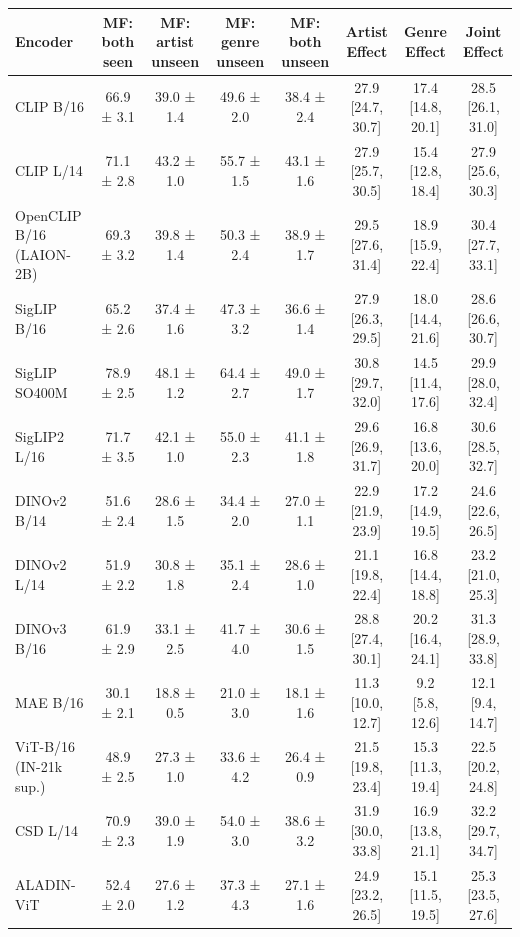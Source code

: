 \begin{tabular}{lccccccc}
\toprule
Encoder & MF: both seen & MF: artist unseen & MF: genre unseen & MF: both unseen & Artist Effect & Genre Effect & Joint Effect \\
\midrule
CLIP B/16 & 66.9 ± 3.1 & 39.0 ± 1.4 & 49.6 ± 2.0 & 38.4 ± 2.4 & 27.9 [24.7, 30.7] & 17.4 [14.8, 20.1] & 28.5 [26.1, 31.0] \\
CLIP L/14 & 71.1 ± 2.8 & 43.2 ± 1.0 & 55.7 ± 1.5 & 43.1 ± 1.6 & 27.9 [25.7, 30.5] & 15.4 [12.8, 18.4] & 27.9 [25.6, 30.3] \\
OpenCLIP B/16 (LAION-2B) & 69.3 ± 3.2 & 39.8 ± 1.4 & 50.3 ± 2.4 & 38.9 ± 1.7 & 29.5 [27.6, 31.4] & 18.9 [15.9, 22.4] & 30.4 [27.7, 33.1] \\
SigLIP B/16 & 65.2 ± 2.6 & 37.4 ± 1.6 & 47.3 ± 3.2 & 36.6 ± 1.4 & 27.9 [26.3, 29.5] & 18.0 [14.4, 21.6] & 28.6 [26.6, 30.7] \\
SigLIP SO400M & 78.9 ± 2.5 & 48.1 ± 1.2 & 64.4 ± 2.7 & 49.0 ± 1.7 & 30.8 [29.7, 32.0] & 14.5 [11.4, 17.6] & 29.9 [28.0, 32.4] \\
SigLIP2 L/16 & 71.7 ± 3.5 & 42.1 ± 1.0 & 55.0 ± 2.3 & 41.1 ± 1.8 & 29.6 [26.9, 31.7] & 16.8 [13.6, 20.0] & 30.6 [28.5, 32.7] \\
DINOv2 B/14 & 51.6 ± 2.4 & 28.6 ± 1.5 & 34.4 ± 2.0 & 27.0 ± 1.1 & 22.9 [21.9, 23.9] & 17.2 [14.9, 19.5] & 24.6 [22.6, 26.5] \\
DINOv2 L/14 & 51.9 ± 2.2 & 30.8 ± 1.8 & 35.1 ± 2.4 & 28.6 ± 1.0 & 21.1 [19.8, 22.4] & 16.8 [14.4, 18.8] & 23.2 [21.0, 25.3] \\
DINOv3 B/16 & 61.9 ± 2.9 & 33.1 ± 2.5 & 41.7 ± 4.0 & 30.6 ± 1.5 & 28.8 [27.4, 30.1] & 20.2 [16.4, 24.1] & 31.3 [28.9, 33.8] \\
MAE B/16 & 30.1 ± 2.1 & 18.8 ± 0.5 & 21.0 ± 3.0 & 18.1 ± 1.6 & 11.3 [10.0, 12.7] & 9.2 [5.8, 12.6] & 12.1 [9.4, 14.7] \\
ViT-B/16 (IN-21k sup.) & 48.9 ± 2.5 & 27.3 ± 1.0 & 33.6 ± 4.2 & 26.4 ± 0.9 & 21.5 [19.8, 23.4] & 15.3 [11.3, 19.4] & 22.5 [20.2, 24.8] \\
CSD L/14 & 70.9 ± 2.3 & 39.0 ± 1.9 & 54.0 ± 3.0 & 38.6 ± 3.2 & 31.9 [30.0, 33.8] & 16.9 [13.8, 21.1] & 32.2 [29.7, 34.7] \\
ALADIN-ViT & 52.4 ± 2.0 & 27.6 ± 1.2 & 37.3 ± 4.3 & 27.1 ± 1.6 & 24.9 [23.2, 26.5] & 15.1 [11.5, 19.5] & 25.3 [23.5, 27.6] \\
\bottomrule
\end{tabular}
